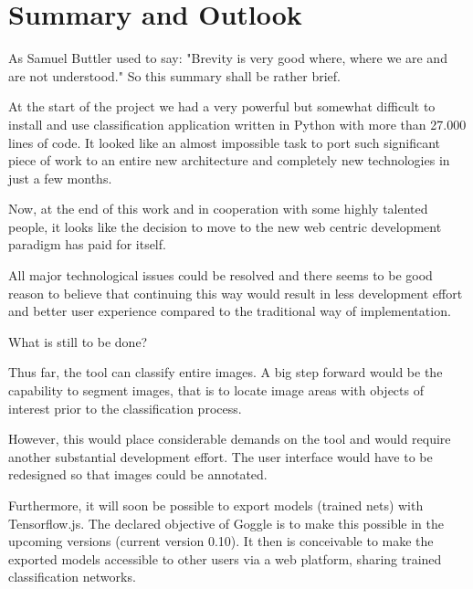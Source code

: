 \chapter{Summary and Outlook}

As Samuel Buttler used to say: "Brevity is very good where,
where we are and are not understood." So this summary shall be rather brief.

At the start of the project we had a very powerful but
somewhat difficult to install and use classification
 application written in Python with more than 27.000 lines of code. 
It looked like
an almost impossible task to port such significant piece of
work to an entire new architecture and completely new technologies in just a few months.

Now, at the end of this work and in cooperation with some 
highly talented people, it looks like the decision to
 move to the new web centric development paradigm has 
 paid for itself.

All major technological issues could be resolved and there seems to be good reason to believe that continuing this way
would result in less development effort and better user
experience compared to the traditional way of
implementation.

What is still to be done?

Thus far, the tool can classify entire images. A big step forward would be the capability to segment images, 
that is to locate image areas with objects of interest
prior to the classification process. 

However, this would place considerable demands on the tool and would
require another substantial development effort. The user interface would have to be redesigned so that 
images could be annotated.  

Furthermore, it will soon be possible to export models
 (trained nets) with Tensorflow.js. The declared objective
of Goggle is to make this possible in the upcoming
versions (current version 0.10). It then is conceivable
to make the exported models accessible to other users
via a web platform, sharing trained classification
networks. 
